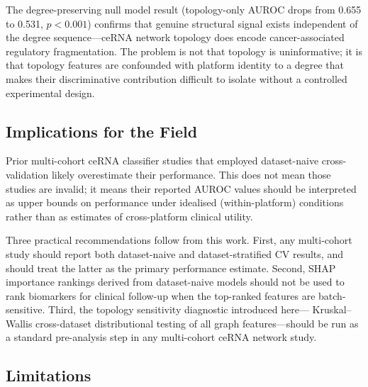 \documentclass[12pt]{article}
\begin{document}
The degree-preserving null model result (topology-only AUROC drops from
0.655 to 0.531, $p<0.001$) confirms that genuine structural signal
exists independent of the degree sequence---ceRNA network topology does
encode cancer-associated regulatory fragmentation. The problem is not
that topology is uninformative; it is that topology features are
confounded with platform identity to a degree that makes their
discriminative contribution difficult to isolate without a controlled
experimental design.

\subsection{Implications for the Field}

Prior multi-cohort ceRNA classifier studies that employed dataset-naive
cross-validation likely overestimate their performance. This does not
mean those studies are invalid; it means their reported AUROC values
should be interpreted as upper bounds on performance under idealised
(within-platform) conditions rather than as estimates of
cross-platform clinical utility.

Three practical recommendations follow from this work. First, any
multi-cohort study should report both dataset-naive and
dataset-stratified CV results, and should treat the latter as the
primary performance estimate. Second, SHAP importance rankings derived
from dataset-naive models should not be used to rank biomarkers for
clinical follow-up when the top-ranked features are batch-sensitive.
Third, the topology sensitivity diagnostic introduced here---
Kruskal--Wallis cross-dataset distributional testing of all graph
features---should be run as a standard pre-analysis step in any
multi-cohort ceRNA network study.

\subsection{Limitations}
\end{document}
